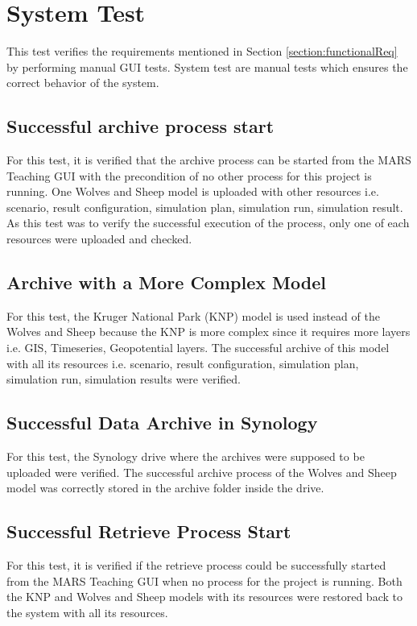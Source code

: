\section{System Test}
This test verifies the requirements mentioned in Section \ref{section:functionalReq} by performing manual GUI tests. System test are manual tests
which ensures the correct behavior of the system.

\subsection{Successful archive process start}
For this test, it is verified that the archive process can be started from the MARS Teaching GUI with the precondition of no other process
for this project is running. One Wolves and Sheep model is uploaded with other resources i.e. scenario, result configuration,
simulation plan, simulation run, simulation result. As this test was to verify the successful execution of the process, only one of each resources
were uploaded and checked.

\subsection{Archive with a More Complex Model}
For this test, the Kruger National Park (KNP) model is used instead of the Wolves and Sheep because the KNP is more complex since it requires more layers
i.e. GIS, Timeseries, Geopotential layers. The successful archive of this model with all its resources i.e. scenario, result configuration, simulation plan, simulation run,
simulation results were verified. 

\subsection{Successful Data Archive in Synology}
For this test, the Synology drive where the archives were supposed to be uploaded were verified. The successful archive process of the Wolves and Sheep model
was correctly stored in the archive folder inside the drive.

\subsection{Successful Retrieve Process Start}
For this test, it is verified if the retrieve process could be successfully started from the MARS Teaching GUI when no process for the project is running.
Both the KNP and Wolves and Sheep models with its resources were restored back to the system with all its resources. 

